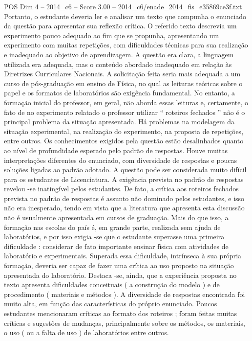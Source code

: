 \begin{textsample}{POS Dim 4 – 2014\_c6 – Score 3.00 – 2014\_c6/enade\_2014\_fis\_e35869ce3f.txt}
Portanto, o estudante deveria ler e analisar um texto que compunha o enunciado da questão para apresentar sua reflexão crítica.
O referido texto descrevia um experimento pouco adequado ao fim que se propunha, apresentando um experimento com muitas repetições, com dificuldades técnicas para sua realização e inadequado ao objetivo de aprendizagem.
A questão era clara, a linguagem utilizada era adequada, mas o conteúdo abordado inadequado em relação às Diretrizes Curriculares Nacionais.
A solicitação feita seria mais adequada a um curso de pós-graduação em ensino de Física, no qual as leituras teóricas sobre o papel e os formatos de laboratórios são exigência fundamental.
No entanto, a formação inicial do professor, em geral, não aborda essas leituras e, certamente, o fato de no experimento relatado o professor utilizar “ roteiros fechados ” não é o principal problema da situação apresentada.
Há problemas na modelagem da situação experimental, na realização do experimento, na proposta de repetições, entre outros.
Os conhecimentos exigidos pela questão estão desalinhados quanto ao nível de profundidade esperado pelo padrão de respostas.
Houve muitas interpretações diferentes do enunciado, com diversidade de respostas e poucas soluções ligadas ao padrão adotado.
A questão pode ser considerada muito difícil para os estudantes de Licenciatura.
A exigência prevista no padrão de respostas revelou -se inatingível pelos estudantes.
De fato, a crítica aos roteiros fechados prevista no padrão de respostas é assunto não dominado pelos estudantes, e isso não era inesperado, tendo em vista que a literatura que apresenta esta discussão não é usualmente apresentada em cursos de graduação.
Mais do que isso, a formação nas escolas do país é, em grande parte, realizada sem ajuda de laboratórios, e por isso exigia -se que o estudante superasse uma primeira dificuldade : considerar de fato importante ensinar física com atividades de laboratório e experimentais.
Superada essa dificuldade, intrínseca à sua própria formação, deveria ser capaz de fazer uma crítica ao uso proposto na situação apresentada do laboratório.
Destaca -se, ainda, que a experiência proposta no texto apresenta dificuldades conceituais ( a construção do modelo ) e de procedimento ( materiais e métodos ).
A diversidade de respostas encontrada foi muito alta, em função das características do próprio enunciado.
Poucos estudantes mencionaram críticas ao formato dos roteiros ; foram feitas muitas críticas e sugestões de mudanças, principalmente sobre os métodos, os materiais, o uso ( ou a falta de uso ) de laboratórios entre outros.

\end{textsample}
